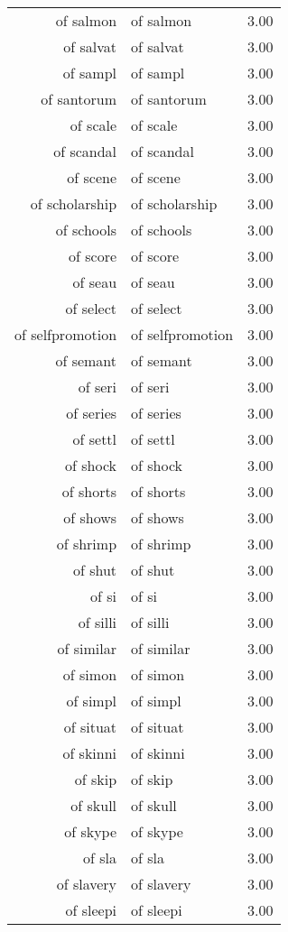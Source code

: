 \begin{table}[ht]
\begin{tabular}{rlr}
  of salmon & of salmon & 3.00 \\ 
  of salvat & of salvat & 3.00 \\ 
  of sampl & of sampl & 3.00 \\ 
  of santorum & of santorum & 3.00 \\ 
  of scale & of scale & 3.00 \\ 
  of scandal & of scandal & 3.00 \\ 
  of scene & of scene & 3.00 \\ 
  of scholarship & of scholarship & 3.00 \\ 
  of schools & of schools & 3.00 \\ 
  of score & of score & 3.00 \\ 
  of seau & of seau & 3.00 \\ 
  of select & of select & 3.00 \\ 
  of selfpromotion & of selfpromotion & 3.00 \\ 
  of semant & of semant & 3.00 \\ 
  of seri & of seri & 3.00 \\ 
  of series & of series & 3.00 \\ 
  of settl & of settl & 3.00 \\ 
  of shock & of shock & 3.00 \\ 
  of shorts & of shorts & 3.00 \\ 
  of shows & of shows & 3.00 \\ 
  of shrimp & of shrimp & 3.00 \\ 
  of shut & of shut & 3.00 \\ 
  of si & of si & 3.00 \\ 
  of silli & of silli & 3.00 \\ 
  of similar & of similar & 3.00 \\ 
  of simon & of simon & 3.00 \\ 
  of simpl & of simpl & 3.00 \\ 
  of situat & of situat & 3.00 \\ 
  of skinni & of skinni & 3.00 \\ 
  of skip & of skip & 3.00 \\ 
  of skull & of skull & 3.00 \\ 
  of skype & of skype & 3.00 \\ 
  of sla & of sla & 3.00 \\ 
  of slavery & of slavery & 3.00 \\ 
  of sleepi & of sleepi & 3.00 \\ 

\end{tabular}
\end{table}
